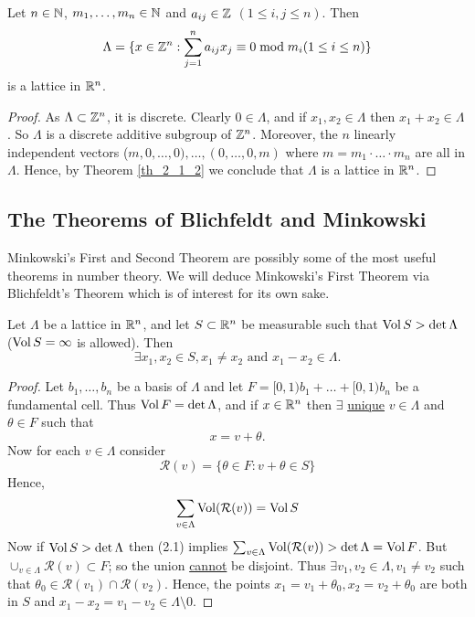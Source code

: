 \documentclass[NumTh.tex]{subfiles}
\begin{document}
\begin{cor}
  Let $n \in \mathbb{N}$, $m_1,\dots,m_n \in \mathbb{N}$ and $a_{ij} \in \mathbb{Z}$ $(1\leq i,j \leq n)$.
  Then 
  \[ \Lambda = \{ x \in \mathbb{Z}^n : \sum_{j=1}^n a_{ij} x_j \equiv 0 \bmod m_i (1 \leq i \leq n) \} \]
  is a lattice in $\mathbb{R}^n$.
\end{cor}

\begin{proof}
  As $\Lambda \subset \mathbb{Z}^n$, it is discrete. Clearly $0 \in \Lambda$, and if $x_1,x_2 \in \Lambda$ then $x_1 + x_2 \in \Lambda$.
  So $\Lambda$ is a discrete additive subgroup of $\mathbb{Z}^n$.
  Moreover, the $n$ linearly independent vectors ($m,0,\dots,0),\dots,(0,\dots,0,m)$ where $m = m_1 \cdot \dots \cdot m_n$
  are all in $\Lambda$.
  Hence, by Theorem \ref{th_2_1_2} we conclude that $\Lambda$ is a lattice in $\mathbb{R}^n$.
\end{proof}


\subsection{The Theorems of Blichfeldt and Minkowski}

Minkowski's First and Second Theorem are possibly some of the most useful theorems in number theory.
We will deduce Minkowski's First Theorem via Blichfeldt's Theorem which is of interest for its own sake.

\begin{theorem}
  Let $\Lambda$ be a lattice in $\mathbb{R}^n$, and let $S \subset \mathbb{R}^n$ be measurable such that $\operatorname{Vol} S > \det \Lambda$ ($\operatorname{Vol} S = \infty$ is allowed).
  Then 
  \[ \exists x_1,x_2 \in S, x_1 \neq x_2 \text{ and } x_1 - x_2 \in \Lambda \text{.}\]
\end{theorem}

\begin{proof}
  Let $b_1,\dots,b_n$ be a basis of $\Lambda$ and let $F = [0,1) b_1 + \dots + [0,1) b_n$ be a fundamental cell.
  Thus $\operatorname{Vol} F = \det \Lambda$, and if $x \in \mathbb{R}^n$ then $\exists$ \underline{unique} $v \in \Lambda$ and $\theta \in F$ such that
  \[ x = v + \theta \text{.}\]
  Now for each $v \in \Lambda$ consider
  \[ \mathcal{R}(v) = \{ \theta \in F : v + \theta \in S \} \]
  Hence, 
  \[ \sum_{v \in \Lambda} \operatorname{Vol}(\mathcal{R}(v)) = \operatorname{Vol} S \]
  Now if $\operatorname{Vol} S > \det \Lambda$ then (2.1) implies $\sum_{v \in \Lambda} \operatorname{Vol} (\mathcal{R}(v)) > \det \Lambda = \operatorname{Vol} F  $.
  But $\cup_{v \in \Lambda} \mathcal{R}(v) \subset F$; so the union \underline{cannot} be disjoint.
  Thus $\exists v_1,v_2 \in \Lambda, v_1 \neq v_2$ such that $\theta_0 \in \mathcal{R}(v_1) \cap \mathcal{R}(v_2)$.
  Hence, the points $x_1 = v_1 + \theta_0, x_2 = v_2 + \theta_0$ are both in $S$ and $x_1 - x_2 = v_1 - v_2 \in \Lambda \setminus 0$.
\end{proof}
\end{document}
